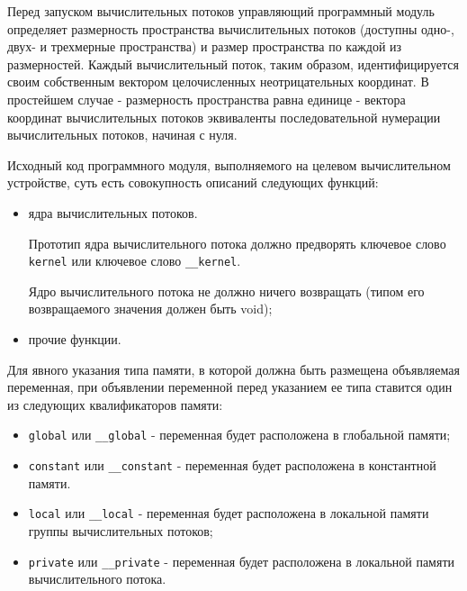 Перед запуском вычислительных потоков управляющий программный модуль определяет размерность пространства вычислительных потоков (доступны одно-, двух- и трехмерные пространства) и размер пространства по каждой из размерностей. Каждый вычислительный поток, таким образом, идентифицируется своим собственным вектором целочисленных неотрицательных координат. В простейшем случае - размерность пространства равна единице - вектора координат вычислительных потоков эквиваленты последовательной нумерации вычислительных потоков, начиная с нуля.



		Исходный код программного модуля, выполняемого на целевом вычислительном устройстве, суть есть совокупность описаний следующих функций:

		\begin{itemize}

			\item ядра вычислительных потоков.

				Прототип ядра вычислительного потока должно предворять ключевое слово \verb|kernel| или ключевое слово \verb|__kernel|.

				Ядро вычислительного потока не должно ничего возвращать (типом его возвращаемого значения должен быть void);

			\item прочие функции.

		\end{itemize}


		Для явного указания типа памяти, в которой должна быть размещена объявляемая переменная, при объявлении переменной перед указанием ее типа ставится один из следующих квалификаторов памяти:

		\begin{itemize}

			\item \verb|global| или \verb|__global| - переменная будет расположена в глобальной памяти;
			\item \verb|constant| или \verb|__constant| - переменная будет расположена в константной памяти.
			\item \verb|local| или \verb|__local| - переменная будет расположена в локальной памяти группы вычислительных потоков;
			\item \verb|private| или \verb|__private| - переменная будет расположена в локальной памяти вычислительного потока.

		\end{itemize}

